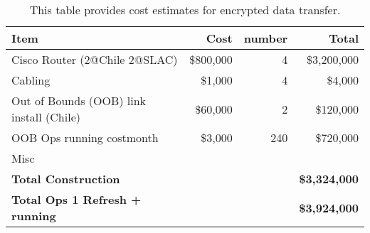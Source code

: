 \tiny \begin{longtable} {|l|r|r|r|} \caption{This table provides cost estimates for encrypted data transfer. \label{tab:ipsec}}\\ 
\hline 
\textbf{Item}&\textbf{Cost}&\textbf{number}&\textbf{Total} \\ \hline
{Cisco Router (2@Chile 2@SLAC)}&{\$800,000}&{4}&{\$3,200,000} \\ \hline
{Cabling}&{\$1,000}&{4}&{\$4,000} \\ \hline
{Out of Bounds (OOB) link  install (Chile)}&{\$60,000}&{2}&{\$120,000} \\ \hline
{OOB Ops running cost\/month}&{\$3,000}&{240}&{\$720,000} \\ \hline
{Misc}&&& \\ \hline
\textbf{Total Construction}&\textbf{}&\textbf{}&\textbf{\$3,324,000} \\ \hline
\textbf{Total Ops 1 Refresh  + running }&\textbf{}&\textbf{}&\textbf{\$3,924,000} \\ \hline
\end{longtable} \normalsize

